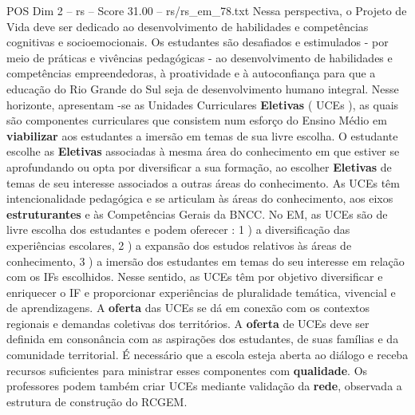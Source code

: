 \begin{textsample}{POS Dim 2 – rs – Score 31.00 – rs/rs\_em\_78.txt}
Nessa perspectiva, o Projeto de Vida deve ser dedicado ao desenvolvimento de habilidades e competências cognitivas e socioemocionais.
Os estudantes são desafiados e estimulados - por meio de práticas e vivências pedagógicas - ao desenvolvimento de habilidades e competências empreendedoras, à proatividade e à autoconfiança para que a educação do Rio Grande do Sul seja de desenvolvimento humano integral.
Nesse horizonte, apresentam -se as Unidades Curriculares \textbf{Eletivas} ( UCEs ), as quais são componentes curriculares que consistem num esforço do Ensino Médio em \textbf{viabilizar} aos estudantes a imersão em temas de sua livre escolha.
O estudante escolhe as \textbf{Eletivas} associadas à mesma área do conhecimento em que estiver se aprofundando ou opta por diversificar a sua formação, ao escolher \textbf{Eletivas} de temas de seu interesse associados a outras áreas do conhecimento.
As UCEs têm intencionalidade pedagógica e se articulam às áreas do conhecimento, aos eixos \textbf{estruturantes} e às Competências Gerais da BNCC.
No EM, as UCEs são de livre escolha dos estudantes e podem oferecer : 1 ) a diversificação das experiências escolares, 2 ) a expansão dos estudos relativos às áreas de conhecimento, 3 ) a imersão dos estudantes em temas do seu interesse em relação com os IFs escolhidos.
Nesse sentido, as UCEs têm por objetivo diversificar e enriquecer o IF e proporcionar experiências de pluralidade temática, vivencial e de aprendizagens.
A \textbf{oferta} das UCEs se dá em conexão com os contextos regionais e demandas coletivas dos territórios.
A \textbf{oferta} de UCEs deve ser definida em consonância com as aspirações dos estudantes, de suas famílias e da comunidade territorial.
É necessário que a escola esteja aberta ao diálogo e receba recursos suficientes para ministrar esses componentes com \textbf{qualidade}.
Os professores podem também criar UCEs mediante validação da \textbf{rede}, observada a estrutura de construção do RCGEM.

\end{textsample}

